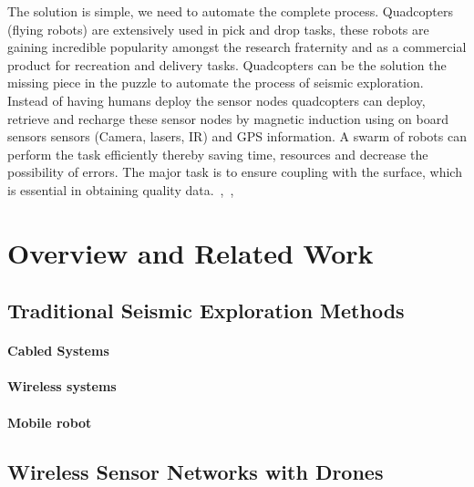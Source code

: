 \documentclass[conference]{IEEEtran}
\newcommand{\todo}[1]{\vspace{5 mm}\par \noindent \framebox{\begin{minipage}[c]{0.98 \columnwidth} \ttfamily\flushleft \textcolor{red}{#1}\end{minipage}}\vspace{5 mm}\par}
\begin{document}
The solution is simple, we need to automate the complete process. Quadcopters (flying robots) are extensively used in pick and drop tasks, these robots are gaining incredible popularity amongst the research fraternity and as a commercial product for recreation and delivery tasks. Quadcopters can be the solution the missing piece in the puzzle to automate the process of seismic exploration. Instead of having humans deploy the sensor nodes quadcopters can deploy, retrieve and recharge these sensor nodes by magnetic induction using on board sensors sensors (Camera, lasers, IR) and GPS information. A swarm of robots can perform the task efficiently thereby saving time, resources and decrease the possibility of errors. The major task is to ensure coupling with the surface, which is essential in obtaining quality data.~\cite{MVEwaWSN05},~\cite{CtMiSD08},~\cite{DSSMaA14} 

\section{Overview and Related Work}\label{sec:RelatedWork}


\subsection{Traditional Seismic Exploration Methods}

\todo{cite the book that Li sent us.  Also cite some papers by Rob.}

\todo{ an equation describing seismic waves in earth }


 \paragraph{Cabled Systems}
 
 \paragraph{Wireless systems}
 
 \paragraph{Mobile robot}  \todo{mention the patent here}
 
\subsection{Wireless Sensor Networks with Drones}
   \todo{cite some recent robotics papers on drone sensor networks}
\end{document}

